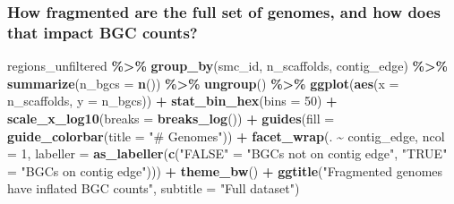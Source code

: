\documentclass[
]{article}
\newenvironment{Shaded}{\begin{snugshade}}{\end{snugshade}}
\newcommand{\AttributeTok}[1]{\textcolor[rgb]{0.13,0.29,0.53}{#1}}
\newcommand{\DecValTok}[1]{\textcolor[rgb]{0.00,0.00,0.81}{#1}}
\newcommand{\FunctionTok}[1]{\textcolor[rgb]{0.13,0.29,0.53}{\textbf{#1}}}
\newcommand{\NormalTok}[1]{#1}
\newcommand{\OtherTok}[1]{\textcolor[rgb]{0.56,0.35,0.01}{#1}}
\newcommand{\SpecialCharTok}[1]{\textcolor[rgb]{0.81,0.36,0.00}{\textbf{#1}}}
\newcommand{\StringTok}[1]{\textcolor[rgb]{0.31,0.60,0.02}{#1}}
\begin{document}
\hypertarget{how-fragmented-are-the-full-set-of-genomes-and-how-does-that-impact-bgc-counts}{%
\subsubsection{How fragmented are the full set of genomes, and how does
that impact BGC
counts?}\label{how-fragmented-are-the-full-set-of-genomes-and-how-does-that-impact-bgc-counts}}

\begin{Shaded}
\begin{Highlighting}[]
\NormalTok{regions\_unfiltered }\SpecialCharTok{\%\textgreater{}\%}
  \FunctionTok{group\_by}\NormalTok{(smc\_id, n\_scaffolds, contig\_edge) }\SpecialCharTok{\%\textgreater{}\%}
  \FunctionTok{summarize}\NormalTok{(}\AttributeTok{n\_bgcs =} \FunctionTok{n}\NormalTok{()) }\SpecialCharTok{\%\textgreater{}\%}
  \FunctionTok{ungroup}\NormalTok{() }\SpecialCharTok{\%\textgreater{}\%}
  \FunctionTok{ggplot}\NormalTok{(}\FunctionTok{aes}\NormalTok{(}\AttributeTok{x =}\NormalTok{ n\_scaffolds, }\AttributeTok{y =}\NormalTok{ n\_bgcs)) }\SpecialCharTok{+}
  \FunctionTok{stat\_bin\_hex}\NormalTok{(}\AttributeTok{bins =} \DecValTok{50}\NormalTok{) }\SpecialCharTok{+}
  \FunctionTok{scale\_x\_log10}\NormalTok{(}\AttributeTok{breaks =} \FunctionTok{breaks\_log}\NormalTok{()) }\SpecialCharTok{+}
  \FunctionTok{guides}\NormalTok{(}\AttributeTok{fill =} \FunctionTok{guide\_colorbar}\NormalTok{(}\AttributeTok{title =} \StringTok{"\# Genomes"}\NormalTok{)) }\SpecialCharTok{+}
  \FunctionTok{facet\_wrap}\NormalTok{(. }\SpecialCharTok{\textasciitilde{}}\NormalTok{ contig\_edge, }\AttributeTok{ncol =} \DecValTok{1}\NormalTok{, }\AttributeTok{labeller =} \FunctionTok{as\_labeller}\NormalTok{(}\FunctionTok{c}\NormalTok{(}\StringTok{"FALSE"} \OtherTok{=} \StringTok{"BGCs not on contig edge"}\NormalTok{, }\StringTok{"TRUE"} \OtherTok{=} \StringTok{"BGCs on contig edge"}\NormalTok{))) }\SpecialCharTok{+}
  \FunctionTok{theme\_bw}\NormalTok{() }\SpecialCharTok{+}
  \FunctionTok{ggtitle}\NormalTok{(}\StringTok{"Fragmented genomes have inflated BGC counts"}\NormalTok{, }\AttributeTok{subtitle =} \StringTok{"Full dataset"}\NormalTok{)}
\end{Highlighting}
\end{Shaded}
\end{document}
